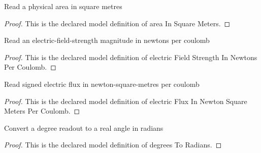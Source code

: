 \begin{definition}
  \label{def:physics:phyx-mini-0998:phyxminiproblems-problemphyxmini0998-areainsquaremeters}
  Read a physical area in square metres
\end{definition}
\begin{proof}
  This is the declared model definition of area In Square Meters.
\end{proof}
\begin{definition}
  \label{def:physics:phyx-mini-0998:phyxminiproblems-problemphyxmini0998-electricfieldstrengthinnewtonspercoulomb}
  Read an electric-field-strength magnitude in newtons per coulomb
\end{definition}
\begin{proof}
  This is the declared model definition of electric Field Strength In Newtons Per Coulomb.
\end{proof}
\begin{definition}
  \label{def:physics:phyx-mini-0998:phyxminiproblems-problemphyxmini0998-electricfluxinnewtonsquaremeterspercoulomb}
  Read signed electric flux in newton-square-metres per coulomb
\end{definition}
\begin{proof}
  This is the declared model definition of electric Flux In Newton Square Meters Per Coulomb.
\end{proof}
\begin{definition}
  \label{def:physics:phyx-mini-0998:phyxminiproblems-problemphyxmini0998-degreestoradians}
  Convert a degree readout to a real angle in radians
\end{definition}
\begin{proof}
  This is the declared model definition of degrees To Radians.
\end{proof}

